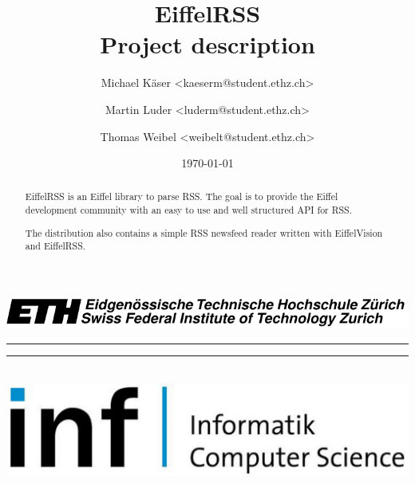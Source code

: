 \documentclass[a4paper,fleqn,titlepage]{article}
\title{EiffelRSS \\ Project description}
\author{
  Michael K\"aser <kaeserm@student.ethz.ch>
  \and 
  Martin Luder <luderm@student.ethz.ch>
  \and 
  Thomas Weibel <weibelt@student.ethz.ch>
}
\date{\today}
\newcommand{\hr}{\rule{\textwidth}{1pt}}
\begin{document}
\begin{titlepage}
  \newlength{\centeroffset}
  \setlength{\centeroffset}{-0.5\oddsidemargin}
  \addtolength{\centeroffset}{0.5\evensidemargin}

  \thispagestyle{empty}

  \noindent\includegraphics[width=\textwidth]{./figures/big_ETH}\\[-3mm]
  \hr






  \noindent\hr\\[1mm]
  \includegraphics[width=\textwidth]{./figures/big_inf}
\end{titlepage}

\begin{abstract}
  EiffelRSS is an Eiffel library to parse RSS. The goal is to provide
  the Eiffel development community with an easy to use and well
  structured API for RSS.
  
  The distribution also contains a simple RSS newsfeed reader written
  with EiffelVision and EiffelRSS.
\end{abstract}
\end{document}
